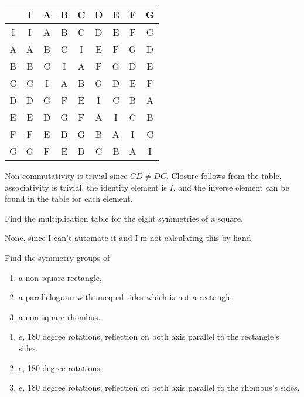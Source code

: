 \begin{solution}\itemfix
    \begin{center}
        \begin{tabular}{C|C|C|C|C|C|C|C|C}
              & I & A & B & C & D & E & F & G \\ \hline
            I & I & A & B & C & D & E & F & G \\
            A & A & B & C & I & E & F & G & D \\
            B & B & C & I & A & F & G & D & E \\
            C & C & I & A & B & G & D & E & F \\
            D & D & G & F & E & I & C & B & A \\
            E & E & D & G & F & A & I & C & B \\
            F & F & E & D & G & B & A & I & C \\
            G & G & F & E & D & C & B & A & I \\
        \end{tabular}
    \end{center}

    Non-commutativity is trivial since \(CD \neq DC\). Closure follows from the table, associativity is trivial, the identity element is \(I\), and the inverse element can be found in the table for each element.
\end{solution}

\begin{exercise}
    Find the multiplication table for the eight symmetries of a square.
\end{exercise}
\begin{solution}
    None, since I can't automate it and I'm not calculating this by hand.
\end{solution}

\begin{exercise}
    Find the symmetry groups of
    \begin{enumerate}
        \item a non-square rectangle,
        \item a parallelogram with unequal sides which is not a rectangle,
        \item a non-square rhombus.
    \end{enumerate}
\end{exercise}

\begin{solution}\itemfix
    \begin{enumerate}
        \item \(e\), 180 degree rotations, reflection on both axis parallel to the rectangle's sides.
        \item \(e\), 180 degree rotations.
        \item \(e\), 180 degree rotations, reflection on both axis parallel to the rhombus's sides.
    \end{enumerate}
\end{solution}

